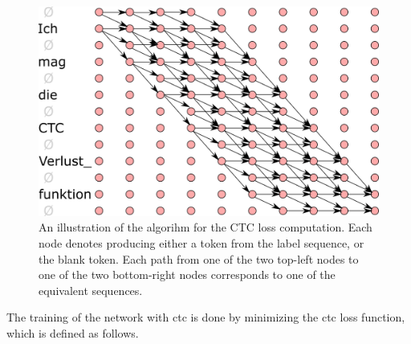 \begin{figure}
  \centering

  \includegraphics[width=13cm]{img/ctc_schema.png}

  \caption{An illustration of the algorihm for the CTC loss computation. Each
    node denotes producing either a token from the label sequence, or the blank
    token. Each path from one of the two top-left nodes to one of the two
    bottom-right nodes corresponds to one of the equivalent sequences.  }
  \label{fig:ctc-dynamic-programming}
\end{figure}


The training of the network with \gls{ctc} is done
by minimizing the \gls{ctc} loss function, which is defined as follows.



